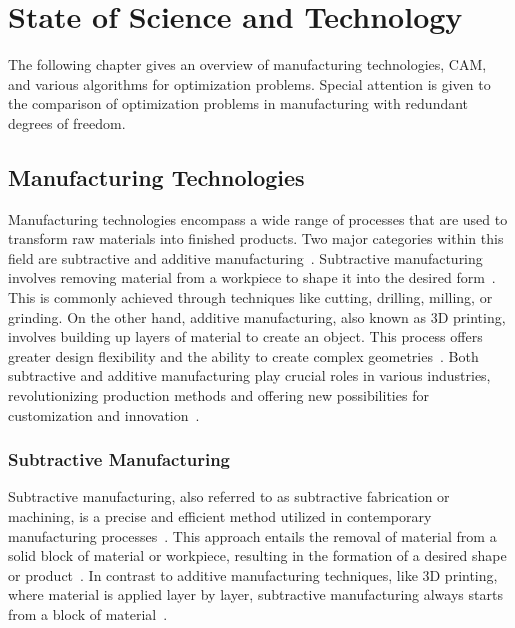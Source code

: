 \chapter{State of Science and Technology}%
The following chapter gives an overview of manufacturing technologies, CAM, and various algorithms for optimization problems. Special attention is given to the comparison of optimization problems in manufacturing with redundant degrees of freedom. 


\section{Manufacturing Technologies}
Manufacturing technologies encompass a wide range of processes that are used to transform raw materials into finished products. Two major categories within this field are subtractive and additive manufacturing~\cite{Iqbal.2020}. Subtractive manufacturing involves removing material from a workpiece to shape it into the desired form~\cite{Watson.2015}. This is commonly achieved through techniques like cutting, drilling, milling, or grinding. On the other hand, additive manufacturing, also known as 3D printing, involves building up layers of material to create an object. This process offers greater design flexibility and the ability to create complex geometries~\cite{Dilberoglu.2017}. Both subtractive and additive manufacturing play crucial roles in various industries, revolutionizing production methods and offering new possibilities for customization and innovation~\cite{Bandyopadhyay.2020, vanLe.2017}.











\subsection{Subtractive Manufacturing}
Subtractive manufacturing, also referred to as subtractive fabrication or machining, is a precise and efficient method utilized in contemporary manufacturing processes~\cite{Wang.2023}. This approach entails the removal of material from a solid block of material or workpiece, resulting in the formation of a desired shape or product~\cite{Calleja.2018}. In contrast to additive manufacturing techniques, like 3D printing, where material is applied layer by layer, subtractive manufacturing always starts from a block of material~\cite{Abdulhameed.2019}.

